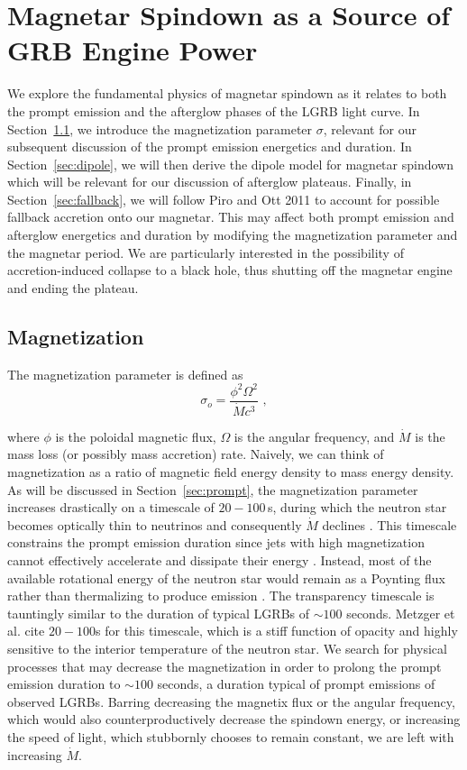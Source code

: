 \documentclass{article}
\begin{document}
\section{Magnetar Spindown as a Source of GRB Engine Power} 
We explore the fundamental physics of magnetar spindown as it relates to both the prompt emission and the afterglow phases of the LGRB light curve. In Section~\ref{sec:magnetization}, we introduce the magnetization parameter $\sigma$, relevant for our subsequent discussion of the prompt emission energetics and duration. In Section~\ref{sec:dipole}, we will then derive the dipole model for magnetar spindown which will be relevant for our discussion of afterglow plateaus. Finally, in Section~\ref{sec:fallback}, we will follow Piro and Ott 2011 \cite{Piro:2011ed} to account for possible fallback accretion onto our magnetar. This may affect both prompt emission and afterglow energetics and duration by modifying the magnetization parameter and the magnetar period.  We are particularly interested in the possibility of accretion-induced collapse to a black hole, thus shutting off the magnetar engine and ending the plateau.

\subsection{Magnetization} \label{sec:magnetization}

The magnetization parameter is defined as
\begin{equation}
\sigma_o= \frac{\phi^2 \Omega^2}{\dot{M} c^3}\,\,,
\end{equation}

where $\phi$ is the poloidal  magnetic flux, $\Omega$ is the angular frequency, and $\dot{M}$ is the mass loss (or possibly mass accretion) rate. Naively, we can think of magnetization as a ratio of magnetic field energy density to mass energy density. As will be discussed in Section~\ref{sec:prompt}, the magnetization parameter increases drastically on a timescale of $20-100$\,s, during which the neutron star becomes optically thin to neutrinos and consequently $\dot{M}$ declines \cite{Metzger:2010pp}. This timescale constrains the prompt emission duration since jets with high magnetization cannot effectively accelerate and dissipate their energy \cite{Metzger:2010pp}. Instead, most of the available rotational energy of the neutron star would remain as a Poynting flux rather than thermalizing to produce emission \cite{Metzger:2010pp}. The transparency timescale is tauntingly similar to the duration of typical LGRBs of $\sim 100$ seconds. Metzger et al. \cite{Metzger:2010pp} cite $20-100$s for this timescale, which is a stiff function of opacity and highly sensitive to the interior temperature of the neutron star. We search for physical processes that may decrease the magnetization in order to prolong the prompt emission duration to $\sim 100$ seconds, a duration typical of prompt emissions of observed LGRBs. Barring decreasing the magnetix flux or the angular frequency, which would also counterproductively decrease the spindown energy, or increasing the speed of light, which stubbornly chooses to remain constant,  we are left with increasing $\dot{M}$. 
\end{document}
